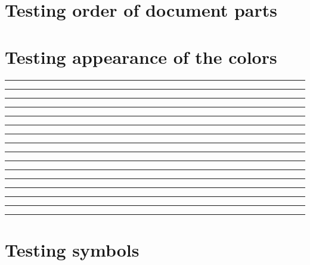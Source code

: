 \documentclass[11pt,a4paper]{article}
\begin{document}
\section{Testing order of document parts}
\loopDocumentPartNumber{}

\section{Testing appearance of the colors}
\textcolor{forest1}{\rule{10pt}{10pt}}%
\textcolor{red1}{\rule{10pt}{10pt}}%
\textcolor{blue1}{\rule{10pt}{10pt}}%
\textcolor{orange1}{\rule{10pt}{10pt}}%
\textcolor{yellow1}{\rule{10pt}{10pt}}%
\textcolor{brown1}{\rule{10pt}{10pt}}%
\textcolor{gray1}{\rule{10pt}{10pt}}%
\textcolor{gray2}{\rule{10pt}{10pt}}%
\textcolor{gray3}{\rule{10pt}{10pt}}%
\textcolor{gray4}{\rule{10pt}{10pt}}%
\textcolor{gray5}{\rule{10pt}{10pt}}%
\textcolor{gray6}{\rule{10pt}{10pt}}%
\textcolor{gray7}{\rule{10pt}{10pt}}%
\textcolor{gray8}{\rule{10pt}{10pt}}%
\textcolor{gray9}{\rule{10pt}{10pt}}%
\textcolor{gray10}{\rule{10pt}{10pt}}%

\section{Testing symbols}
\commonCircleTh~~\commonDiskTh~~\commonSquareTh~~\commonSquareFillTh~~\commonDiamondTh~~\commonDiamondFillTh~~\commonTargetTh~~
\end{document}
